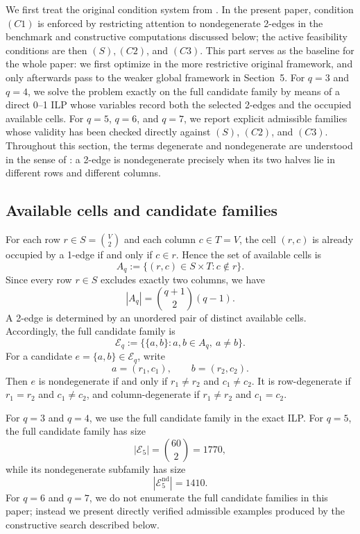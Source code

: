 \documentclass[10pt]{article}
\newcommand{\blue}[1]{#1}
\newcommand{\0}{\mathbf{0}}
\newcommand{\1}{\mathbf{1}}
\begin{document}
\blue{We first treat the original condition system from \cite{QCX26a}. In the present paper, condition \((C1)\) is enforced by restricting attention to nondegenerate 2-edges in the benchmark and constructive computations discussed below; the active feasibility conditions are then \((S),(C2)\), and \((C3)\).} {This part serves as the baseline for the whole paper: we first optimize in the more restrictive original framework, and only afterwards pass to the weaker global framework in Section~5.} \blue{For \(q=3\) and \(q=4\), we solve the problem exactly on the full candidate family by means of a direct 0--1 ILP whose variables record both the selected 2-edges and the occupied available cells. For \(q=5\), \(q=6\), and \(q=7\), we report explicit admissible families whose validity has been checked directly against \((S)\), \((C2)\), and \((C3)\). Throughout this section, the terms degenerate and nondegenerate are understood in the sense of \cite{QCX26a}: a 2-edge is nondegenerate precisely when its two halves lie in different rows and different columns.}

\subsection*{Available cells and candidate families}

For each row \(r\in S=\binom{V}{2}\) and each column \(c\in T=V\), the cell \((r,c)\) is already occupied by a 1-edge if and only if \(c\in r\). Hence the set of available cells is
\[
A_q:=\{(r,c)\in S\times T: c\notin r\}.
\]
Since every row \(r\in S\) excludes exactly two columns, we have
\[
|A_q|=\binom{q+1}{2}(q-1).
\]
A 2-edge is determined by an unordered pair of distinct available cells. Accordingly, the full candidate family is
\[
\mathcal E_q:=\bigl\{\{a,b\}: a,b\in A_q,\ a\neq b\bigr\}.
\]
For a candidate \(e=\{a,b\}\in\mathcal E_q\), write
\[
a=(r_1,c_1),\qquad b=(r_2,c_2).
\]
Then \(e\) is nondegenerate if and only if \(r_1\neq r_2\) and \(c_1\neq c_2\). It is row-degenerate if \(r_1=r_2\) and \(c_1\neq c_2\), and column-degenerate if \(r_1\neq r_2\) and \(c_1=c_2\).

\blue{For \(q=3\) and \(q=4\), we use the full candidate family in the exact ILP. For \(q=5\), the full candidate family has size}
\[
|\mathcal E_5|=\binom{60}{2}=1770,
\]
\blue{while its nondegenerate subfamily has size}
\[
|\mathcal E_5^{\mathrm{nd}}|=1410.
\]
\blue{For \(q=6\) and \(q=7\), we do not enumerate the full candidate families in this paper; instead we present directly verified admissible examples produced by the constructive search described below.}
\end{document}
